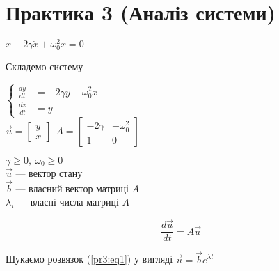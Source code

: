 \section{Практика 3 (Аналіз системи)}

$\ddot{x} + 2\gamma\dot{x} +\omega_0^2x = 0$

Складемо систему

\begin{minipage}{0.40\textwidth}
    $\left\{\begin{aligned}
        \frac{dy}{dt} &= -2\gamma y - \omega_0^2x \\
        \frac{dx}{dt} &= y
    \end{aligned}\right.$
    \\[2mm]
    $\overrightarrow{u} = \begin{bmatrix} y\\x \end{bmatrix} \ \ 
    A = \begin{bmatrix}
        -2\gamma & -\omega_0^2 \\
        1 & 0
    \end{bmatrix}$ 
\end{minipage}
\begin{minipage}{0.49\textwidth}
    $\gamma \ge 0, \ \omega_0 \ge 0$\\[2mm]
    $\overrightarrow{u}$ --- вектор стану\\
    $\overrightarrow{b} $ --- власний вектор матриці $A$\\
    $\lambda_i$ --- власні числа матриці $A$\\[1mm]
\end{minipage}

\begin{equation}\label{pr3:eq1}
    \frac{d\overrightarrow{u}}{dt} = A\overrightarrow{u}
\end{equation}


Шукаємо розвязок (\ref{pr3:eq1}) у вигляді $\overrightarrow{u} = \overrightarrow{b}e^{\lambda t}$









% 

